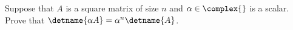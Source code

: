 Suppose that $A$ is a square matrix of size $n$ and $\alpha\in\complex{\null}$ is a scalar.  Prove that $\detname{\alpha A}=\alpha^n\detname{A}$.